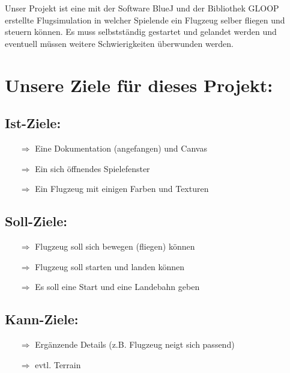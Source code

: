 \documentclass[a4paper, 10pt, oneside]{article} %
\begin{document}
\begin{normalsize}
\begin{spacing}{1}

Unser Projekt ist eine mit der Software BlueJ und der Bibliothek GLOOP erstellte Flugsimulation in welcher Spielende ein Flugzeug selber fliegen und steuern können. Es muss selbstständig gestartet und gelandet werden und eventuell müssen weitere Schwierigkeiten überwunden werden.

\section*{Unsere Ziele für dieses Projekt:}

\subsection*{Ist-Ziele:}

\begin{itemize}
\item[$\Rightarrow$] Eine Dokumentation (angefangen) und Canvas
\item[$\Rightarrow$] Ein sich öffnendes Spielefenster
\item[$\Rightarrow$] Ein Flugzeug mit einigen Farben und Texturen
\end{itemize}

\subsection*{Soll-Ziele:}

\begin{itemize}
\item[$\Rightarrow$] Flugzeug soll sich bewegen (fliegen) können
\item[$\Rightarrow$] Flugzeug soll starten und landen können
\item[$\Rightarrow$] Es soll eine Start und eine Landebahn geben
\end{itemize}

\subsection*{Kann-Ziele:}

\begin{itemize}
\item[$\Rightarrow$] Ergänzende Details (z.B. Flugzeug neigt sich passend)
\item[$\Rightarrow$] evtl. Terrain
\end{itemize}

\end{spacing}
\end{normalsize}
\end{document}
